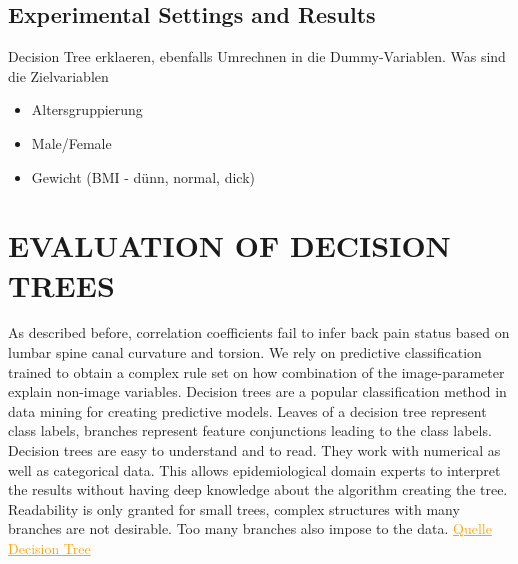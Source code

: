 \documentclass[a4paper,twoside]{style/article}
\newcommand{\com}[1]{\textcolor{orange}{\uline{#1}}}
\begin{document}
%

\subsection{Experimental Settings and Results}
Decision Tree erklaeren, ebenfalls Umrechnen in die Dummy-Variablen. Was sind die Zielvariablen
\begin{itemize}
\item Altersgruppierung
\item Male/Female
\item Gewicht (BMI - dünn, normal, dick)
\end{itemize}


\section{\uppercase{Evaluation of Decision Trees}}
\label{sec:DecisionTrees}
\noindent As described before, correlation coefficients fail to infer back pain status based on lumbar spine canal curvature and torsion.
We rely on predictive classification trained to obtain a complex rule set on how combination of the image-parameter explain non-image variables.
Decision trees are a popular classification method in data mining for creating predictive models.
Leaves of a decision tree represent class labels, branches represent feature conjunctions leading to the class labels.
Decision trees are easy to understand and to read.
They work with numerical as well as categorical data.
This allows epidemiological domain experts to interpret the results without having deep knowledge about the algorithm creating the tree.
Readability is only granted for small trees, complex structures with many branches are not desirable.
Too many branches also impose to the data.
\com{Quelle Decision Tree}
\end{document}
